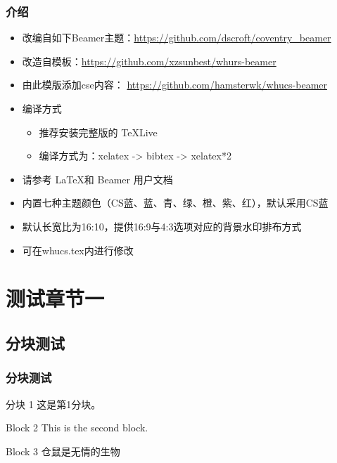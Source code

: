\documentclass[presentation,aspectratio=1610]{beamer}
\begin{document}
\begin{frame}
\frametitle{介绍}
	\begin{itemize}
	\item 改编自如下Beamer主题：\url{https://github.com/dscroft/coventry_beamer}
	\item 改造自模板：\url{https://github.com/xzsunbest/whurs-beamer}
    \item 由此模版添加cse内容： \url{https://github.com/hamsterwk/whucs-beamer}
    \item {编译方式}
	    \begin{itemize}
	    	\item 推荐安装完整版的 TeXLive
	    	\item 编译方式为：xelatex -> bibtex -> xelatex*2
	    \end{itemize}
    \item 请参考 \LaTeX 和 Beamer 用户文档 
    \item 内置七种主题颜色（CS蓝、蓝、青、绿、橙、紫、红），默认采用CS蓝
    \item 默认长宽比为16:10，提供16:9与4:3选项对应的背景水印排布方式
    \item 可在whucs.tex内进行修改
  \end{itemize}
\end{frame}

\section{测试章节一} %

\subsection{分块测试} %

\begin{frame}
\frametitle{分块测试}
	\begin{block}{分块 1}
	这是第1分块。
	\end{block}

	\begin{block}{Block 2}
	This is the second block.
	\end{block}

	\begin{block}{Block 3}
	仓鼠是无情的生物
	\end{block}
\end{frame}
\end{document}
